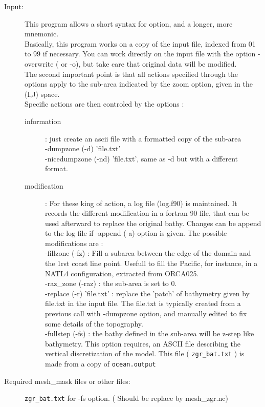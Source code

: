 \documentclass[a4paper,11pt]{article}
\begin{document}
\begin{description}
\item[Input:] This program allows a short syntax for option, and a longer, more mnemonic. \\ 
Basically, this program works on a copy of the input file, indexed from 01 to 99 if necessary. You can work directly
on the input file with the option -overwrite ( or -o), but take care that original data will be modified. \\
The second important point is that all actions specified through the options apply to the sub-area indicated by the zoom 
option, given in the (I,J) space. \\
Specific actions are then controled by the options :\\
\begin{description}
  \item[information]: just create an ascii file with a formatted copy of the sub-area \\
	-dumpzone (-d) 'file.txt' \\
        -nicedumpzone (-nd) 'file.txt', same as -d but with a different format.
  \item[modification]: For these king of action, a log file (log.f90) is maintained. It records the different modification in    
               a fortran 90 file, that can be used afterward to replace the original bathy. Changes can be append to the log file
               if -append (-a) option is given. The possible modifications are :\\
     -fillzone (-fz) : Fill a subarea between the edge of the domain and the 1rst coast line point. Usefull to fill the 
             Pacific, for instance, in a NATL4 configuration, extracted from ORCA025.\\
     -raz\_zone (-raz) : the sub-area is set to 0. \\
     -replace (-r) 'file.txt' : replace the 'patch' of bathymetry given by file.txt in the input file. The file.txt is typically
            created from a previous call with -dumpzone option, and manually edited to fix some details of the topography. \\
     -fullstep (-fs) : the bathy defined in the sub-area will be z-step like bathymetry. This option requires, an ASCII file 
            describing the vertical discretization of the model. This file ( {\tt zgr\_bat.txt} ) is made from a copy of 
            {\tt ocean.output}
\end{description}
\item[Required mesh\_mask files or other files:]  {\tt zgr\_bat.txt} for -fs option. ( Should be replace by mesh\_zgr.nc)

\end{description}
\end{document}
